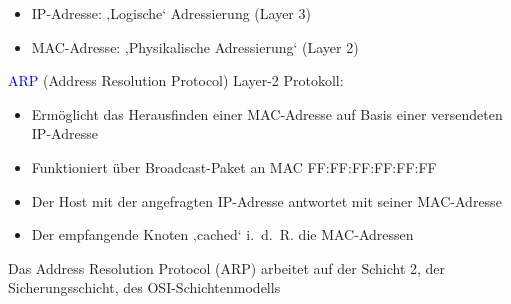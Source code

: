 
\begin{itemize}
    \item IP-Adresse: ‚Logische‘ Adressierung (Layer 3)
    \item MAC-Adresse: ‚Physikalische Adressierung‘ (Layer 2)
\end{itemize}

\textcolor{blue}{ARP} (Address Resolution Protocol) Layer-2 Protokoll:
\begin{itemize}
    \item Ermöglicht das Herausfinden einer MAC-Adresse auf Basis einer versendeten IP-Adresse
    \item Funktioniert über Broadcast-Paket an MAC FF:FF:FF:FF:FF:FF
    \item Der Host mit der angefragten IP-Adresse antwortet mit seiner MAC-Adresse
    \item Der empfangende Knoten ‚cached‘ i.\ d.\ R. die MAC-Adressen
\end{itemize}

Das Address Resolution Protocol (ARP) arbeitet auf der Schicht 2, der Sicherungsschicht, des OSI-Schichtenmodells

